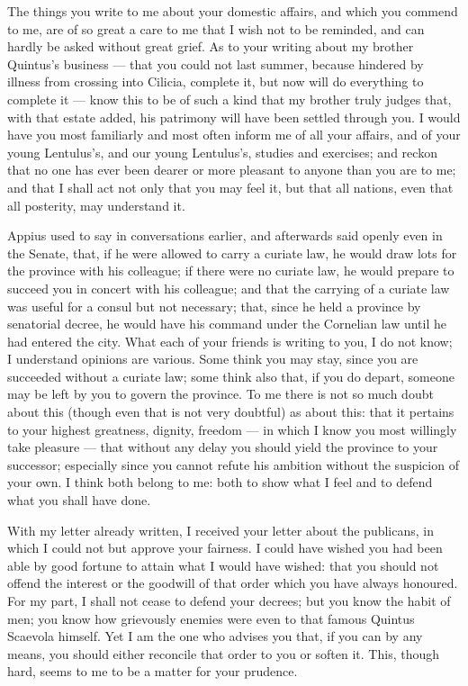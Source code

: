  The things you write to me about your domestic affairs, and which you commend to me, are of so great a care to me that I wish not to be reminded, and can hardly be asked without great grief. As to your writing about my brother Quintus's business --- that you could not last summer, because hindered by illness from crossing into Cilicia, complete it, but now will do everything to complete it --- know this to be of such a kind that my brother truly judges that, with that estate added, his patrimony will have been settled through you. I would have you most familiarly and most often inform me of all your affairs, and of your young Lentulus's, and our young Lentulus's, studies and exercises; and reckon that no one has ever been dearer or more pleasant to anyone than you are to me; and that I shall act not only that you may feel it, but that all nations, even that all posterity, may understand it.

 Appius used to say in conversations earlier, and afterwards said openly even in the Senate, that, if he were allowed to carry a curiate law, he would draw lots for the province with his colleague; if there were no curiate law, he would prepare to succeed you in concert with his colleague; and that the carrying of a curiate law was useful for a consul but not necessary; that, since he held a province by senatorial decree, he would have his command under the Cornelian law until he had entered the city. What each of your friends is writing to you, I do not know; I understand opinions are various. Some think you may stay, since you are succeeded without a curiate law; some think also that, if you do depart, someone may be left by you to govern the province. To me there is not so much doubt about this (though even that is not very doubtful) as about this: that it pertains to your highest greatness, dignity, freedom --- in which I know you most willingly take pleasure --- that without any delay you should yield the province to your successor; especially since you cannot refute his ambition without the suspicion of your own. I think both belong to me: both to show what I feel and to defend what you shall have done.

 With my letter already written, I received your letter about the publicans, in which I could not but approve your fairness. I could have wished you had been able by good fortune to attain what I would have wished: that you should not offend the interest or the goodwill of that order which you have always honoured. For my part, I shall not cease to defend your decrees; but you know the habit of men; you know how grievously enemies were even to that famous Quintus Scaevola himself. Yet I am the one who advises you that, if you can by any means, you should either reconcile that order to you or soften it. This, though hard, seems to me to be a matter for your prudence.
